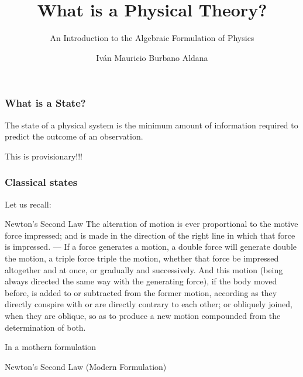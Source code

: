 \documentclass{beamer}
\title{What is a Physical Theory?}
\subtitle{An Introduction to the Algebraic Formulation of Physics}
\author[I.M. Burbano]{Iván Mauricio Burbano Aldana}
\institute[Uniandes]{Universidad de los Andes}
\begin{document}
\frame{\titlepage}

\begin{frame}

\frametitle{What is a State?}

The state of a physical system is the minimum amount of information required to predict the outcome of an observation. 

\Huge This is provisionary!!!

\end{frame}

\begin{frame}

\frametitle{Classical states}

Let us recall:

\begin{block}{Newton's Second Law}
The alteration of motion is ever proportional to the motive force impressed; and is made in the direction of the right line in which that force is impressed. — If a force generates a motion, a double force will generate double the motion, a triple force triple the motion, whether that force be impressed altogether and at once, or gradually and successively. And this motion (being always directed the same way with the generating force), if the body moved before, is added to or subtracted from the former motion, according as they directly conspire with or are directly contrary to each other; or obliquely joined, when they are oblique, so as to produce a new motion compounded from the determination of both.
\end{block}

\end{frame}

\begin{frame}

In a mothern formulation

\begin{block}{Newton's Second Law (Modern Formulation)}

\end{block}

\end{frame}
\end{document}
